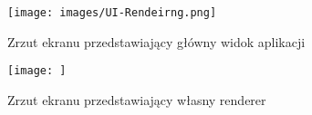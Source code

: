 \begin{figure}[h!]
    \centering
    \begin{minipage}{0.245\textwidth}
        \centering
        \texttt{[image: images/UI-Rendeirng.png]}
    \end{minipage}
    \caption{Zrzut ekranu przedstawiający główny widok aplikacji}
    \label{fig:ui-rendering}
\end{figure}

\begin{figure}[h!]
    \centering
    \begin{minipage}{0.245\textwidth}
        \centering
        \texttt{[image: ]} %
    \end{minipage}
    \caption{Zrzut ekranu przedstawiający własny renderer}
    \label{fig:rendering}
\end{figure}